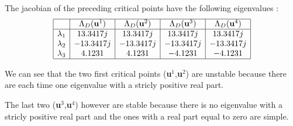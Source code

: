 The jacobian of the preceding critical points have the following eigenvalues : 
$$\begin{array}{|c|c|c|c|c|}
\hline
  & \Lambda_D(\textbf{u}^1) & \Lambda_D(\textbf{u}^2) & \Lambda_D(\textbf{u}^3) & \Lambda_D(\textbf{u}^4) \\ 
\hline
\lambda_1 & 13.3417j & 13.3417j & 13.3417j & 13.3417j \\ 
\lambda_2 & -13.3417j & -13.3417j & -13.3417j & -13.3417j \\ 
\lambda_3 & 4.1231 & 4.1231 & -4.1231 & -4.1231\\
\hline
\end{array} $$

We can see that the two first critical points (\textbf{u}$^1$,\textbf{u}$^2$) are unstable because there are each time one eigenvalue with a stricly positive real part.

The last two (\textbf{u}$^3$,\textbf{u}$^4$) however are stable because there is no eigenvalue with a stricly positive real part and the ones with a real part equal to zero are simple.

